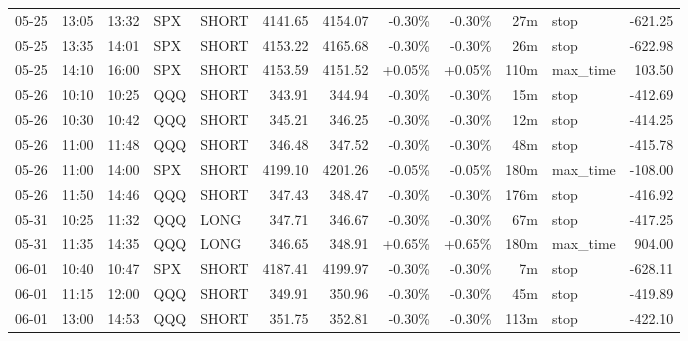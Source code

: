 \documentclass[11pt,a4paper,twoside]{article}
\begin{document}
\begin{center}
\begin{longtable}{>{\color{txtmain}}l l l l l r r r r r >{\color{txtmain}}l r}
05-25 & 13:05 & 13:32 & SPX & SHORT & 4141.65 & 4154.07 & \textcolor{lossred}{-0.30\%} & \textcolor{lossred}{-0.30\%} & 27m & stop & \textcolor{lossred}{-621.25} \\
05-25 & 13:35 & 14:01 & SPX & SHORT & 4153.22 & 4165.68 & \textcolor{lossred}{-0.30\%} & \textcolor{lossred}{-0.30\%} & 26m & stop & \textcolor{lossred}{-622.98} \\
05-25 & 14:10 & 16:00 & SPX & SHORT & 4153.59 & 4151.52 & \textcolor{wingreen}{+0.05\%} & \textcolor{wingreen}{+0.05\%} & 110m & max\_time & \textcolor{wingreen}{103.50} \\
05-26 & 10:10 & 10:25 & QQQ & SHORT & 343.91 & 344.94 & \textcolor{lossred}{-0.30\%} & \textcolor{lossred}{-0.30\%} & 15m & stop & \textcolor{lossred}{-412.69} \\
05-26 & 10:30 & 10:42 & QQQ & SHORT & 345.21 & 346.25 & \textcolor{lossred}{-0.30\%} & \textcolor{lossred}{-0.30\%} & 12m & stop & \textcolor{lossred}{-414.25} \\
05-26 & 11:00 & 11:48 & QQQ & SHORT & 346.48 & 347.52 & \textcolor{lossred}{-0.30\%} & \textcolor{lossred}{-0.30\%} & 48m & stop & \textcolor{lossred}{-415.78} \\
05-26 & 11:00 & 14:00 & SPX & SHORT & 4199.10 & 4201.26 & \textcolor{lossred}{-0.05\%} & \textcolor{lossred}{-0.05\%} & 180m & max\_time & \textcolor{lossred}{-108.00} \\
05-26 & 11:50 & 14:46 & QQQ & SHORT & 347.43 & 348.47 & \textcolor{lossred}{-0.30\%} & \textcolor{lossred}{-0.30\%} & 176m & stop & \textcolor{lossred}{-416.92} \\
05-31 & 10:25 & 11:32 & QQQ & LONG & 347.71 & 346.67 & \textcolor{lossred}{-0.30\%} & \textcolor{lossred}{-0.30\%} & 67m & stop & \textcolor{lossred}{-417.25} \\
05-31 & 11:35 & 14:35 & QQQ & LONG & 346.65 & 348.91 & \textcolor{wingreen}{+0.65\%} & \textcolor{wingreen}{+0.65\%} & 180m & max\_time & \textcolor{wingreen}{904.00} \\
06-01 & 10:40 & 10:47 & SPX & SHORT & 4187.41 & 4199.97 & \textcolor{lossred}{-0.30\%} & \textcolor{lossred}{-0.30\%} & 7m & stop & \textcolor{lossred}{-628.11} \\
06-01 & 11:15 & 12:00 & QQQ & SHORT & 349.91 & 350.96 & \textcolor{lossred}{-0.30\%} & \textcolor{lossred}{-0.30\%} & 45m & stop & \textcolor{lossred}{-419.89} \\
06-01 & 13:00 & 14:53 & QQQ & SHORT & 351.75 & 352.81 & \textcolor{lossred}{-0.30\%} & \textcolor{lossred}{-0.30\%} & 113m & stop & \textcolor{lossred}{-422.10} \\

\end{longtable}
\end{center}
\end{document}
